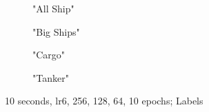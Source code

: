 \begin{figure}[H]
     \centering
     \begin{subfigure}[b]{0.496\textwidth}
         \centering
         
         \caption{"All Ship"}
     \end{subfigure}
     \hfill
     \begin{subfigure}[b]{0.496\textwidth}
         \centering
         
         \caption{"Big Ships"}
         \label{fig:plotBig}
     \end{subfigure}
     \hfill
     \begin{subfigure}[b]{0.496\textwidth}
         \centering
         
         \caption{"Cargo"}
     \end{subfigure}
          \hfill
     \begin{subfigure}[b]{0.496\textwidth}
         \centering
         
         \caption{"Tanker"}
     \end{subfigure}
     \label{fig:resultsBar}
        \caption{10 seconds, lr6, 256, 128, 64, 10 epochs; Labels}
\end{figure}

